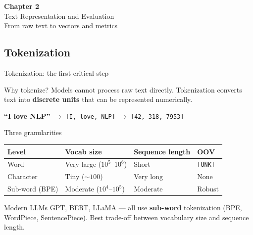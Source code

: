 \documentclass[11pt,aspectratio=169]{beamer}
\begin{document}
\begin{frame}
\centering
\Large \textbf{Chapter 2}\\[1em]
\large Text Representation and Evaluation\\[1em]
\normalsize From raw text to vectors and metrics
\end{frame}

\subsection{Tokenization}

\begin{frame}{Tokenization: the first critical step}
\begin{block}{Why tokenize?}
Models cannot process raw text directly. Tokenization converts text into \textbf{discrete units} that can be represented numerically.
\end{block}
\vfill
\begin{center}
\end{center}
\vfill
\textbf{``I love NLP''} $\to$ \texttt{[I, love, NLP]} $\to$ \texttt{[42, 318, 7953]}
\end{frame}

\begin{frame}{Three granularities}
\begin{center}
\begin{tabular}{|l|l|l|l|}
\hline
\textbf{Level} & \textbf{Vocab size} & \textbf{Sequence length} & \textbf{OOV} \\
\hline
Word & Very large ($10^5$--$10^6$) & Short & \texttt{[UNK]} \\
Character & Tiny ($\sim 100$) & Very long & None \\
Sub-word (BPE) & Moderate ($10^4$--$10^5$) & Moderate & Robust \\
\hline
\end{tabular}
\end{center}
\vfill
\begin{block}{Modern LLMs}
GPT, BERT, LLaMA --- all use \textbf{sub-word} tokenization (BPE, WordPiece, SentencePiece). Best trade-off between vocabulary size and sequence length.
\end{block}
\end{frame}
\end{document}
